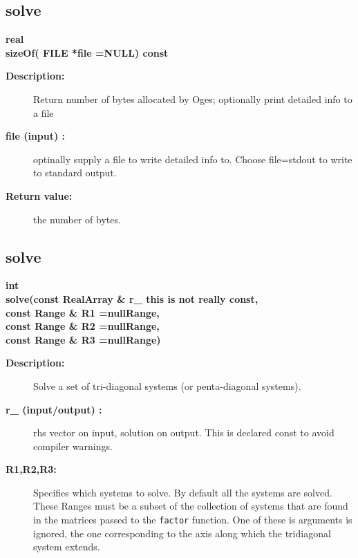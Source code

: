 \subsection{solve}
 
\begin{flushleft} \textbf{%
real  \\ 
\settowidth{\TridiagonalSolverIncludeArgIndent}{sizeOf(}%
sizeOf( FILE *file  =NULL) const 
}\end{flushleft}
\begin{description}
\item[{\bf Description:}]  
   Return number of bytes allocated by Oges; optionally print detailed info to a file

\item[{\bf file (input) :}]  optinally supply a file to write detailed info to. Choose file=stdout to
 write to standard output.
\item[{\bf Return value:}]  the number of bytes.
\end{description}
\subsection{solve}
 
\begin{flushleft} \textbf{%
int  \\ 
\settowidth{\TridiagonalSolverIncludeArgIndent}{solve(}%
solve(const RealArray \& r\_ this is not really const,\\ 
\hspace{\TridiagonalSolverIncludeArgIndent}const Range \& R1  =nullRange, \\ 
\hspace{\TridiagonalSolverIncludeArgIndent}const Range \& R2  =nullRange, \\ 
\hspace{\TridiagonalSolverIncludeArgIndent}const Range \& R3  =nullRange)
}\end{flushleft}
\begin{description}
\item[{\bf Description:}] 
    Solve a set of tri-diagonal systems (or penta-diagonal systems). 
\item[{\bf r\_ (input/output) :}]  rhs vector on input, solution on output. This is declared const to avoid compiler
    warnings.
\item[{\bf R1,R2,R3:}]  Specifies which systems to solve. By default all the systems are solved.
  These Ranges must be a subset of the collection of
  systems that are found in the matrices passed to the {\tt factor} function.
  One of these is arguments is ignored, the one corresponding to the axis along which the
  tridiagonal system extends. 
\end{description}
